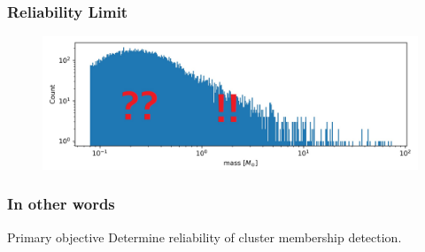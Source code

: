 \documentclass{beamer}
\begin{document}
\begin{frame}
\frametitle{Reliability Limit}
  \begin{figure}
  \includegraphics[width=\linewidth]{Images/IMF2.jpg}
  \end{figure}
\end{frame}

\begin{frame}
\frametitle{In other words}
\begin{block}{Primary objective}
Determine reliability of cluster membership detection.
\end{block}
\end{frame}

%


%
\end{document}
